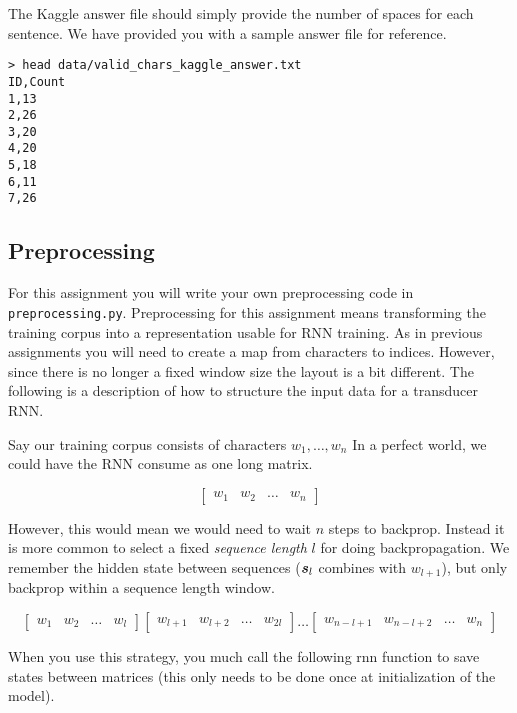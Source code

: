 \documentclass[11pt]{article}
\begin{document}
The Kaggle answer file should simply provide the number of spaces for each sentence. 
We have provided you with a sample answer file for reference.     

\begin{lstlisting}
> head data/valid_chars_kaggle_answer.txt 
ID,Count
1,13
2,26
3,20
4,20
5,18
6,11
7,26
\end{lstlisting}

\subsection{Preprocessing}

For this assignment you will write your own preprocessing code
in \texttt{preprocessing.py}. Preprocessing for this assignment
means transforming the training corpus into a representation 
usable for RNN training. As in previous assignments you 
will need to create a map from characters 
to indices. However, since there is no longer a fixed window size the layout is 
a bit different. The following is a description of how to structure the 
input data for a transducer RNN.

Say our training corpus consists of characters $w_1, \ldots, w_n$ 
In a perfect world, 
we could have the RNN consume as one long matrix. 

\[
  \begin{bmatrix}
    w_1 & w_2 & \ldots & w_n
  \end{bmatrix}
\] 

However, this would mean we would need to wait $n$ steps to backprop. Instead 
it is more common to select a fixed \textit{sequence length} $l$ for doing 
backpropagation. We remember the hidden state between
sequences ($\boldsymbol{s}_l$ combines with $w_{l+1}$), but only 
backprop within a sequence length window. 

\[
  \begin{bmatrix}
    w_1 & w_2 & \ldots & w_{l}
  \end{bmatrix}   \begin{bmatrix}
    w_{l+1} & w_{l+2} & \ldots & w_{2l}
  \end{bmatrix}
  \ldots
  \begin{bmatrix}
    w_{n-l+1} & w_{n-l+2} & \ldots & w_{n}
  \end{bmatrix}
\] 

When you use this strategy, you much call the following rnn function to save states between 
matrices (this only needs to be done once at initialization of the model).
\end{document}
